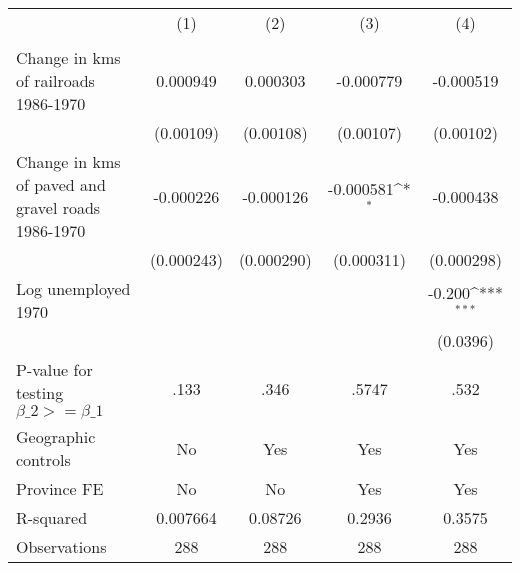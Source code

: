 {
\def\sym#1{\ifmmode^{#1}\else\(^{#1}\)\fi}
\begin{tabular}{l*{4}{c}}
\hline\hline
                &\multicolumn{1}{c}{(1)}&\multicolumn{1}{c}{(2)}&\multicolumn{1}{c}{(3)}&\multicolumn{1}{c}{(4)}\\
                &\multicolumn{1}{c}{}&\multicolumn{1}{c}{}&\multicolumn{1}{c}{}&\multicolumn{1}{c}{}\\
\hline
Change in kms of railroads 1986-1970& 0.000949         & 0.000303         &-0.000779         &-0.000519         \\
                &(0.00109)         &(0.00108)         &(0.00107)         &(0.00102)         \\
[1em]
Change in kms of paved and gravel roads 1986-1970&-0.000226         &-0.000126         &-0.000581\sym{*}  &-0.000438         \\
                &(0.000243)         &(0.000290)         &(0.000311)         &(0.000298)         \\
[1em]
Log unemployed 1970&                  &                  &                  &   -0.200\sym{***}\\
                &                  &                  &                  & (0.0396)         \\
\hline
P-value for testing $\beta\_{2} >= \beta\_{1}$&     .133         &     .346         &    .5747         &     .532         \\
Geographic controls&       No         &      Yes         &      Yes         &      Yes         \\
Province FE     &       No         &       No         &      Yes         &      Yes         \\
R-squared       & 0.007664         &  0.08726         &   0.2936         &   0.3575         \\
Observations    &      288         &      288         &      288         &      288         \\
\hline\hline
\end{tabular}
}

